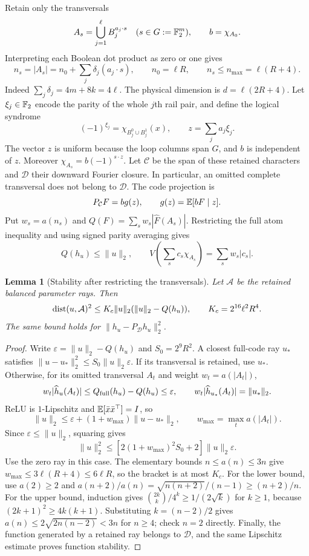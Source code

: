 \documentclass[11pt]{article}
\newtheorem{lemma}[theorem]{Lemma}
\theoremstyle{remark}\newtheorem{remark}[theorem]{Remark}
\begin{document}
Retain only the transversals
\[
 A_s=\bigcup_{j=1}^{\ell}B_j^{a_j\cdot s}
       \quad(s\in G:=\mathbb F_2^m),\qquad b=\chi_{A_0}.
\]
Interpreting each Boolean dot product as zero or one gives
\begin{equation}\label{eq:path-degrees}
 n_s=|A_s|=n_0+\sum_j\delta_j(a_j\cdot s),\qquad
 n_0=\ell R,\qquad n_s\le n_{\max}=\ell(R+4).
\end{equation}
Indeed $\sum_j\delta_j=4m+8k=4\ell$.
The physical dimension is $d=\ell(2R+4)$.
Let $\xi_j\in\mathbb F_2$ encode the parity of the whole $j$th rail pair,
and define the logical syndrome
\[
 (-1)^{\xi_j}=\chi_{B_j^0\cup B_j^1}(x),\qquad
 z=\sum_ja_j\xi_j.
\]
The vector $z$ is uniform because the loop columns span $G$, and $b$
is independent of $z$. Moreover $\chi_{A_s}=b(-1)^{s\cdot z}$.
Let $\mathcal C$ be the span of these retained characters and
$\mathcal D$ their downward Fourier closure. In particular, an omitted
complete transversal does not belong to $\mathcal D$. The code projection is
\begin{equation}\label{eq:code-projection}
 P_{\mathcal C}F=bg(z),\qquad g(z)=\mathbb E[bF\mid z].
\end{equation}
Put $w_s=a(n_s)$ and $Q(F)=\sum_s w_s|\widehat F(A_s)|$.
Restricting the full atom inequality and using signed parity averaging gives
\begin{equation}\label{eq:subcode-norm}
 Q(h_u)\le\|u\|_2,
 \qquad V\left(\sum_sc_s\chi_{A_s}\right)=\sum_sw_s|c_s|.
\end{equation}

\begin{lemma}[Stability after restricting the transversals]\label{lem:subcode-stability}
Let $\mathcal A$ be the retained balanced parameter rays. Then
\[
 \operatorname{dist}(u,\mathcal A)^2\le K_c\|u\|_2(\|u\|_2-Q(h_u)),
 \qquad K_c=2^{16}\ell^2R^4.
\]
The same bound holds for $\|h_u-P_{\mathcal D}h_u\|_2^2$.
\end{lemma}
\begin{proof}
Write $\varepsilon=\|u\|_2-Q(h_u)$ and $S_0=2^9R^2$.
A closest full-code ray $u_*$ satisfies
$\|u-u_*\|_2^2\le S_0\|u\|_2\varepsilon$.
If its transversal is retained, use $u_*$. Otherwise, for its omitted
transversal $A_t$ and weight $w_t=a(|A_t|)$,
\[
 w_t|\widehat h_u(A_t)|\le Q_{\rm full}(h_u)-Q(h_u)
 \le\varepsilon,
 \qquad w_t|\widehat h_{u_*}(A_t)|=\|u_*\|_2.
\]
ReLU is $1$-Lipschitz and $\mathbb E[\bar x\bar x^\top]=I$, so
\[
 \|u\|_2\le\varepsilon+(1+w_{\max})\|u-u_*\|_2,
 \qquad w_{\max}=\max_t a(|A_t|).
\]
Since $\varepsilon\le\|u\|_2$, squaring gives
\[
 \|u\|_2^2\le[2(1+w_{\max})^2S_0+2]\|u\|_2\varepsilon.
\]
Use the zero ray in this case. The elementary bounds $n\le a(n)\le3n$
give $w_{\max}\le3\ell(R+4)\le6\ell R$, so the bracket is at most
$K_c$. For the lower bound, use $a(2)\ge2$ and
$a(n+2)/a(n)=\sqrt{n(n+2)}/(n-1)\ge(n+2)/n$.
For the upper bound, induction gives
$\binom{2k}k/4^k\ge1/(2\sqrt k)$ for $k\ge1$, because
$(2k+1)^2\ge4k(k+1)$. Substituting $k=(n-2)/2$ gives
$a(n)\le2\sqrt{2n(n-2)}<3n$ for $n\ge4$; check $n=2$ directly.
Finally, the function generated by a retained ray belongs to
$\mathcal D$, and the same Lipschitz estimate proves function stability.
\end{proof}
\end{document}
